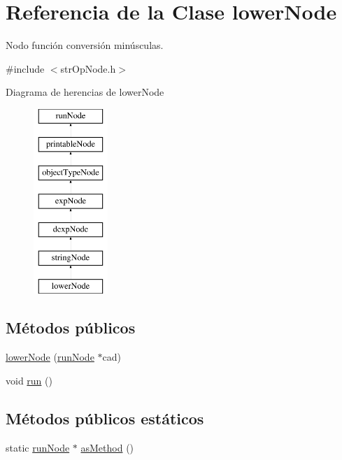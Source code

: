 \hypertarget{classlowerNode}{\section{Referencia de la Clase lower\-Node}
\label{classlowerNode}
}


Nodo función conversión minúsculas.  




{\ttfamily \#include $<$str\-Op\-Node.\-h$>$}

Diagrama de herencias de lower\-Node\begin{figure}[H]
\begin{center}
\leavevmode
\includegraphics[height=7.000000cm]{classlowerNode}
\end{center}
\end{figure}
\subsection*{Métodos públicos}
\begin{DoxyCompactItemize}
\item 
\hyperlink{classlowerNode_a7bb870eca74faa41f3d376feae7f7f98}{lower\-Node} (\hyperlink{classrunNode}{run\-Node} $\ast$cad)
\item 
void \hyperlink{classlowerNode_a791d630f65f89ba5329cd7beaeb5f3c7}{run} ()
\end{DoxyCompactItemize}
\subsection*{Métodos públicos estáticos}
\begin{DoxyCompactItemize}
\item 
static \hyperlink{classrunNode}{run\-Node} $\ast$ \hyperlink{classlowerNode_a697433594fc31646302b1e561eb047db}{as\-Method} ()
\end{DoxyCompactItemize}
